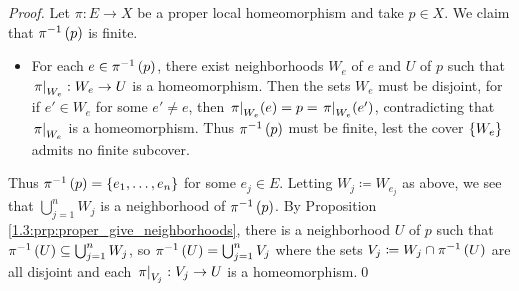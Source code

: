 \documentclass[../Moduli_Spaces_of_Riemann_Surfaces.tex]{subfiles}
\begin{document}
    \begin{proof}
        Let $\pi:E\to X$ be a proper local homeomorphism and take $p\in X$. We claim that $\pi^{-1}\left(p\right)$ is finite.
        \begin{itemize}
            \item For each $e\in\pi^{-1}\left(p\right)$, there exist neighborhoods $W_e$ of $e$ and $U$ of $p$ such that $\left.\pi\right|_{W_e}:W_e\to U$ is a homeomorphism. Then the sets $W_e$ must be disjoint, for if $e'\in W_e$ for some $e'\neq e$, then $\left.\pi\right|_{W_e}\!\left(e\right)=p=\left.\pi\right|_{W_e}\!\left(e'\right)$, contradicting that $\left.\pi\right|_{W_e}$ is a homeomorphism. Thus $\pi^{-1}\left(p\right)$ must be finite, lest the cover $\left\{W_e\right\}$ admits no finite subcover.
        \end{itemize}
        Thus $\pi^{-1}\left(p\right)=\left\{e_1,\dots,e_n\right\}$ for some $e_j\in E$. Letting $W_j\coloneqq W_{e_j}$ as above, we see that $\bigcup_{j=1}^{n}W_j$ is a neighborhood of $\pi^{-1}\left(p\right)$. By Proposition \ref{1.3:prp:proper_give_neighborhoods}, there is a neighborhood $U$ of $p$ such that $\pi^{-1}\left(U\right)\subseteq\bigcup_{j=1}^{n}W_j$, so $\pi^{-1}\left(U\right)=\bigcup_{j=1}^{n}V_j$ where the sets $V_j\coloneqq W_j\cap\pi^{-1}\left(U\right)$ are all disjoint and each $\left.\pi\right|_{V_j}:V_j\to U$ is a homeomorphism.\qed
    \end{proof}
\end{document}
